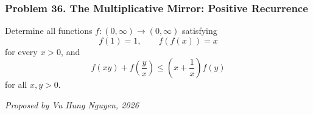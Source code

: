 \subsubsection*{Problem 36. The Multiplicative Mirror: Positive Recurrence}

\begin{exercisebox}[hard]

Determine all functions $f:(0,\infty)\to(0,\infty)$ satisfying
\[
f(1)=1,\qquad f(f(x))=x
\]
for every $x>0$, and
\[
f(xy)+f\left(\frac yx\right)
\le \left(x+\frac1x\right)f(y)
\]
for all $x,y>0$.

\begin{flushright}
\textit{Proposed by Vu Hung Nguyen, 2026}
\end{flushright}


\end{exercisebox}